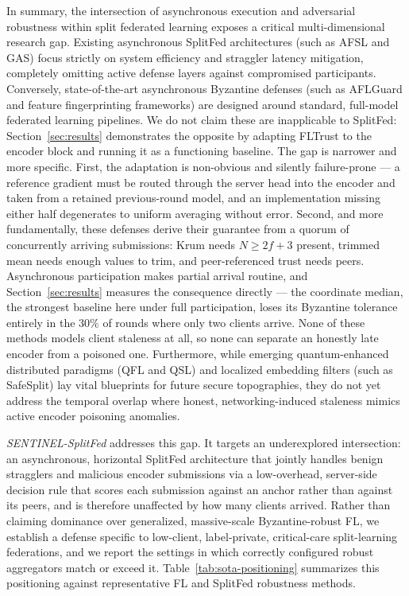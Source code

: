 \documentclass[pdflatex,sn-mathphys-num]{sn-jnl}
\begin{document}
In summary, the intersection of asynchronous execution and adversarial robustness within split federated learning exposes a critical multi-dimensional research gap. Existing asynchronous SplitFed architectures (such as AFSL and GAS) focus strictly on system efficiency and straggler latency mitigation, completely omitting active defense layers against compromised participants. Conversely, state-of-the-art asynchronous Byzantine defenses (such as AFLGuard and feature fingerprinting frameworks) are designed around standard, full-model federated learning pipelines. We do not claim these are inapplicable to SplitFed: Section~\ref{sec:results} demonstrates the opposite by adapting FLTrust to the encoder block and running it as a functioning baseline. The gap is narrower and more specific. First, the adaptation is non-obvious and silently failure-prone --- a reference gradient must be routed through the server head into the encoder and taken from a retained previous-round model, and an implementation missing either half degenerates to uniform averaging without error. Second, and more fundamentally, these defenses derive their guarantee from a quorum of concurrently arriving submissions: Krum needs $N\geq2f+3$ present, trimmed mean needs enough values to trim, and peer-referenced trust needs peers. Asynchronous participation makes partial arrival routine, and Section~\ref{sec:results} measures the consequence directly --- the coordinate median, the strongest baseline here under full participation, loses its Byzantine tolerance entirely in the $30\%$ of rounds where only two clients arrive. None of these methods models client staleness at all, so none can separate an honestly late encoder from a poisoned one. Furthermore, while emerging quantum-enhanced distributed paradigms (QFL and QSL) and localized embedding filters (such as SafeSplit) lay vital blueprints for future secure topographies, they do not yet address the temporal overlap where honest, networking-induced staleness mimics active encoder poisoning anomalies. 

\emph{SENTINEL-SplitFed} addresses this gap. It targets an underexplored intersection: an asynchronous, horizontal SplitFed architecture that jointly handles benign stragglers and malicious encoder submissions via a low-overhead, server-side decision rule that scores each submission against an anchor rather than against its peers, and is therefore unaffected by how many clients arrived. Rather than claiming dominance over generalized, massive-scale Byzantine-robust FL, we establish a defense specific to low-client, label-private, critical-care split-learning federations, and we report the settings in which correctly configured robust aggregators match or exceed it. Table~\ref{tab:sota-positioning} summarizes this positioning against representative FL and SplitFed robustness methods.
\end{document}
